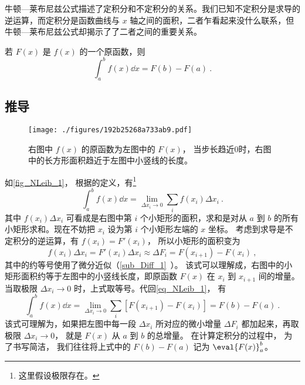 

牛顿—莱布尼兹公式描述了定积分和不定积分的关系。我们已知不定积分是求导的逆运算，而定积分是函数曲线与 $x$ 轴之间的面积，二者乍看起来没什么联系，但牛顿—莱布尼兹公式却揭示了了二者之间的重要关系。

若 $F(x)$ 是 $f(x)$ 的一个原函数，则
\begin{equation}\label{eq_NLeib_1}
\int_a^b f(x) \dd{x}  = F(b) - F(a)~.
\end{equation}

\subsection{推导}
\begin{figure}[ht]
\centering
\texttt{[image: ./figures/192b25268a733ab9.pdf]}
\caption{右图中 $f(x)$ 的原函数为左图中的 $F(x)$， 当步长趋近0时，右图中的长方形面积趋近于左图中小竖线的长度。}\label{fig_NLeib_1}
\end{figure}

如\autoref{fig_NLeib_1}， 根据的定义，有\footnote{这里假设极限存在。}
\begin{equation}
\int_a^b f(x) \dd{x}= \lim_{\Delta x_i\to 0}\sum_i f(x_i)\Delta x_i~.
\end{equation}
其中 $f(x_i)\Delta x_i$ 可看成是右图中第 $i$ 个小矩形的面积，求和是对从 $a$ 到 $b$ 的所有小矩形求和。现在不妨把 $x_i$ 设为第 $i$ 个小矩形左端的 $x$ 坐标。 考虑到求导是不定积分的逆运算，有 $f(x_i)=F'(x_i)$， 所以小矩形的面积变为
\begin{equation}
f(x_i)\Delta x_i = F'(x_i)\Delta x_i \approx \Delta F_i = F(x_{i+1})-F(x_i)~,
\end{equation}
其中的约等号使用了微分近似（\autoref{sub_Diff_1}~）。 该式可以理解成，右图中的小矩形面积约等于左图中的小竖线长度，即原函数 $F(x)$ 在 $x_i$ 到 $x_{i+1}$ 间的增量。当取极限 $\Delta x_i \to 0$ 时，上式取等号。代回\autoref{eq_NLeib_1}， 有
\begin{equation}
\int_a^b f(x) \dd{x}= \lim_{\Delta x_i\to 0}\sum_i [F(x_{i+1})-F(x_i)] = F(b)-F(a)~.
\end{equation}
该式可理解为，如果把左图中每一段 $\Delta x_i$ 所对应的微小增量 $\Delta F_i$ 都加起来，再取极限 $\Delta x_i \to 0$， 就是 $F(x)$ 从 $a$ 到 $b$ 的总增量。 在计算定积分的过程中， 为了书写简洁， 我们往往将上式中的 $F(b) - F(a)$ 记为 $\eval{F(x)}_a^b$。


